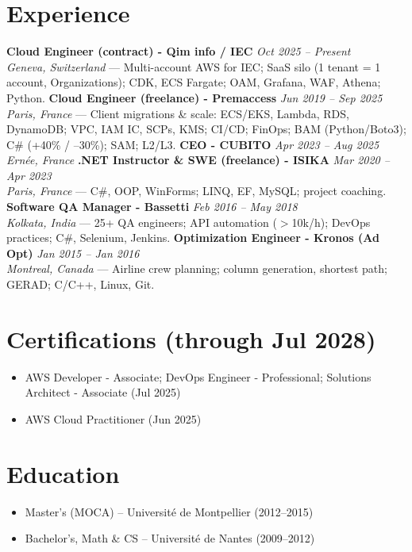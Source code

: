 \documentclass[10pt,a4paper]{article}
\newcommand{\resumeSection}[1]{\section*{#1}\vspace{-2mm}}
\newcommand{\smallGap}{\vspace{-1mm}}
\begin{document}
\resumeSection{Experience}
\textbf{Cloud Engineer (contract) - Qim info / IEC} \hfill \emph{Oct 2025 -- Present}\\
\textit{Geneva, Switzerland} --- Multi-account AWS for IEC; SaaS silo (1 tenant = 1 account, Organizations); CDK, ECS Fargate; OAM, Grafana, WAF, Athena; Python.
\smallGap
\textbf{Cloud Engineer (freelance) - Premaccess} \hfill \emph{Jun 2019 -- Sep 2025}\\
\textit{Paris, France} --- Client migrations \& scale: ECS/EKS, Lambda, RDS, DynamoDB; VPC, IAM IC, SCPs, KMS; CI/CD; FinOps; BAM (Python/Boto3); C\# (+40\% / --30\%); SAM; L2/L3.
\smallGap
\textbf{CEO - CUBITO} \hfill \emph{Apr 2023 -- Aug 2025} \quad \textit{Ern\'ee, France}
\smallGap
\textbf{.NET Instructor \& SWE (freelance) - ISIKA} \hfill \emph{Mar 2020 -- Apr 2023}\\
\textit{Paris, France} --- C\#, OOP, WinForms; LINQ, EF, MySQL; project coaching.
\smallGap
\textbf{Software QA Manager - Bassetti} \hfill \emph{Feb 2016 -- May 2018}\\
\textit{Kolkata, India} --- 25+ QA engineers; API automation ($>$10k/h); DevOps practices; C\#, Selenium, Jenkins.
\smallGap
\textbf{Optimization Engineer - Kronos (Ad Opt)} \hfill \emph{Jan 2015 -- Jan 2016}\\
\textit{Montreal, Canada} --- Airline crew planning; column generation, shortest path; GERAD; C/C++, Linux, Git.

\resumeSection{Certifications (through Jul 2028)}
\begin{itemize}
  \item AWS Developer - Associate; DevOps Engineer - Professional; Solutions Architect - Associate (Jul 2025)
  \item AWS Cloud Practitioner (Jun 2025)
\end{itemize}

\resumeSection{Education}
\begin{itemize}
  \item Master's (MOCA) -- Universit\'e de Montpellier (2012--2015)
  \item Bachelor's, Math \& CS -- Universit\'e de Nantes (2009--2012)
\end{itemize}
\end{document}
